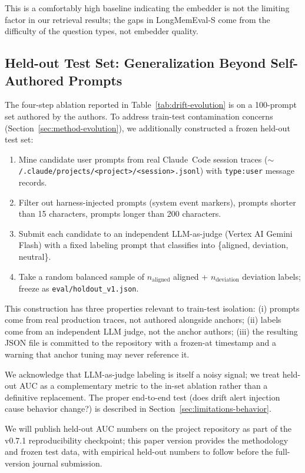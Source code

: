 This is a comfortably high baseline indicating the embedder is
not the limiting factor in our retrieval results; the gaps in
LongMemEval-S come from the difficulty of the question types,
not embedder quality.

\subsection{Held-out Test Set: Generalization Beyond Self-Authored Prompts}
\label{sec:eval-holdout}

The four-step ablation reported in
Table~\ref{tab:drift-evolution} is on a 100-prompt set authored
by the authors. To address train-test contamination concerns
(Section~\ref{sec:method-evolution}), we additionally constructed
a frozen held-out test set:

\begin{enumerate}
\item Mine candidate user prompts from real Claude~Code session
  traces (\texttt{$\sim$/.claude/projects/<project>/<session>.jsonl})
  with \texttt{type:user} message records.
\item Filter out harness-injected prompts (system event markers),
  prompts shorter than 15 characters, prompts longer than 200
  characters.
\item Submit each candidate to an independent LLM-as-judge (Vertex
  AI Gemini Flash) with a fixed labeling prompt that classifies
  into \{aligned, deviation, neutral\}.
\item Take a random balanced sample of $n_{\mathrm{aligned}}$
  aligned + $n_{\mathrm{deviation}}$ deviation labels; freeze as
  \texttt{eval/holdout\_v1.json}.
\end{enumerate}

This construction has three properties relevant to train-test
isolation: (i) prompts come from real production traces, not
authored alongside anchors; (ii) labels come from an independent
LLM judge, not the anchor authors; (iii) the resulting JSON file
is committed to the repository with a frozen-at timestamp and a
warning that anchor tuning may never reference it.

We acknowledge that LLM-as-judge labeling is itself a noisy
signal; we treat held-out AUC as a complementary metric to the
in-set ablation rather than a definitive replacement. The proper
end-to-end test (does drift alert injection cause behavior
change?) is described in Section~\ref{sec:limitations-behavior}.

We will publish held-out AUC numbers on the project repository as
part of the v0.7.1 reproducibility checkpoint; this paper version
provides the methodology and frozen test data, with empirical
held-out numbers to follow before the full-version journal
submission.

